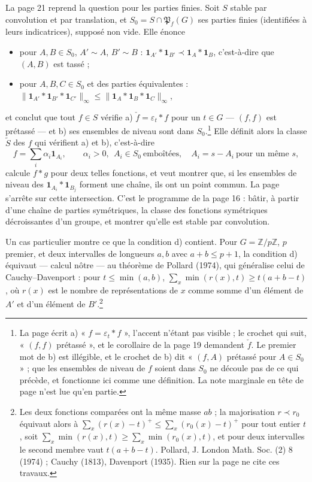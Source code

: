 \documentclass[11pt,a4paper]{article}
\begin{document}
La page 21 reprend la question pour les parties finies. Soit $S$ stable par
convolution et par translation, et $S_0 = S \cap \mathfrak{P}_f(G)$ ses
parties finies (identifiées à leurs indicatrices), supposé non vide. Elle
énonce
\begin{itemize}
  \item[d)] pour $A, B \in S_0$, $A' \sim A$, $B' \sim B$ :
  $\mathbf{1}_{A'} * \mathbf{1}_{B'} \prec \mathbf{1}_A * \mathbf{1}_B$,
  c'est-à-dire que $(A, B)$ est tassé ;
  \item[e)] pour $A, B, C \in S_0$ et des parties équivalentes :
  $\|\mathbf{1}_{A'} * \mathbf{1}_{B'} * \mathbf{1}_{C'}\|_\infty \leqslant
  \|\mathbf{1}_A * \mathbf{1}_B * \mathbf{1}_C\|_\infty$,
\end{itemize}
et conclut que tout $f \in S$ vérifie a) $\check f = \varepsilon_t * f$
pour un $t \in G$ --- $(f, f)$ est prétassé --- et b) ses ensembles de niveau
sont dans $S_0$.\footnote{La page écrit a) « $f = \varepsilon_t * f$ »,
l'accent n'étant pas visible ; le crochet qui suit, « $(f, f)$ prétassé »,
et le corollaire de la page 19 demandent $\check f$. Le premier mot de b) est
illégible, et le crochet de b) dit « $(f, A)$ prétassé pour $A \in S_0$ » ;
que les ensembles de niveau de $f$ soient dans $S_0$ ne découle pas de ce qui
précède, et fonctionne ici comme une définition. La note marginale en tête de
page n'est lue qu'en partie.} Elle définit alors la classe $\widetilde{S}$
des $f$ qui vérifient a) et b), c'est-à-dire
\[
f = \sum_i \alpha_i \mathbf{1}_{A_i},
\qquad \alpha_i > 0,\ \ A_i \in S_0 \ \text{emboîtées},\quad
A_i = s - A_i \ \text{pour un même } s,
\]
calcule $f * g$ pour deux telles fonctions, et veut montrer que, si les
ensembles de niveau des $\mathbf{1}_{A_i} * \mathbf{1}_{B_j}$ forment une
chaîne, ils ont un point commun. La page s'arrête sur cette intersection.
C'est le programme de la page 16 : bâtir, à partir d'une chaîne de parties
symétriques, la classe des fonctions symétriques décroissantes d'un groupe,
et montrer qu'elle est stable par convolution.

Un cas particulier montre ce que la condition d) contient. Pour
$G = \mathbb{Z}/p\mathbb{Z}$, $p$ premier, et deux intervalles de longueurs
$a, b$ avec $a + b \leqslant p + 1$, la condition d) équivaut --- calcul
nôtre --- au théorème de Pollard (1974), qui généralise celui de
Cauchy--Davenport : pour $t \leqslant \min(a, b)$,
$\sum_x \min(r(x), t) \geqslant t(a + b - t)$, où $r(x)$ est le nombre de
représentations de $x$ comme somme d'un élément de $A'$ et d'un élément de
$B'$.\footnote{Les deux fonctions comparées ont la même masse $ab$ ; la
majorisation $r \prec r_0$ équivaut alors à
$\sum_x (r(x) - t)^+ \leqslant \sum_x (r_0(x) - t)^+$ pour tout entier $t$,
soit $\sum_x \min(r(x), t) \geqslant \sum_x \min(r_0(x), t)$, et pour deux
intervalles le second membre vaut $t(a + b - t)$. Pollard, J. London Math.
Soc. (2) 8 (1974) ; Cauchy (1813), Davenport (1935). Rien sur la page ne
cite ces travaux.}
\end{document}
